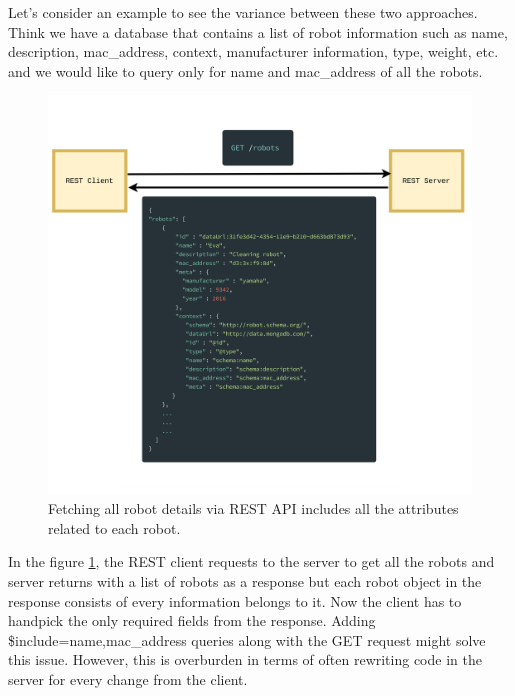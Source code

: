 	Let's consider an example to see the variance between these two approaches. Think we have a database that contains a list of robot information such as name, description, mac\_address, context, manufacturer information, type, weight, etc. and we would like to query only for name and mac\_address of all the robots. 
	
	\begin{figure}[!htbp] 
		\begin{center}
			\includegraphics[trim={0 0 0 2cm},clip,scale=0.08]{./images/png/rest_declarative}	
			\caption{Fetching all robot details via REST API includes all the attributes related to each robot.}	
			\label{fig:rest_declarative}	
		\end{center}
	\end{figure}

	In the figure \ref{fig:rest_declarative}, the REST client requests to the server to get all the robots and server returns with a list of robots as a response but each robot object in the response consists of every information belongs to it. Now the client has to handpick the only required fields from the response. 
	Adding \$include=name,mac\_address queries along with the GET request might solve this issue. However, this is overburden in terms of often rewriting code in the server for every change from the client.   
	

